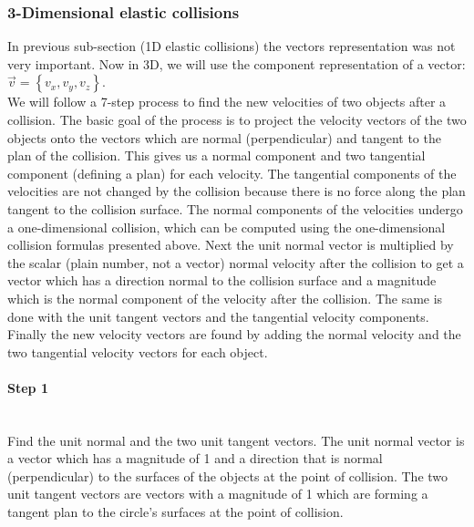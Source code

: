 \subsubsection{3-Dimensional elastic collisions}
In previous sub-section (1D elastic collisions) the vectors representation was not very important.
Now in 3D, we will use the component representation of a vector: $\vec{v} = \left\{ v_x, v_y, v_z \right\}$.\\

We will follow a 7-step process to find the new velocities of two objects after a collision. 
The basic goal of the process is to project the velocity vectors of the two objects onto the vectors which are normal (perpendicular) and tangent to the plan of the collision. 
This gives us a normal component and two tangential component (defining a plan) for each velocity. 
The tangential components of the velocities are not changed by the collision because there is no force along the plan tangent to the collision surface. 
The normal components of the velocities undergo a one-dimensional collision, which can be computed using the one-dimensional collision formulas presented above.
Next the unit normal vector is multiplied by the scalar (plain number, not a vector) normal velocity after the collision to get a vector which has a direction normal to the collision surface and a magnitude which is the normal component of the velocity after the collision. 
The same is done with the unit tangent vectors and the tangential velocity components. 
Finally the new velocity vectors are found by adding the normal velocity and the two tangential velocity vectors for each object.

\paragraph{Step 1}
~\\
Find the unit normal and the two unit tangent vectors.
The unit normal vector is a vector which has a magnitude of 1 and a direction that is normal (perpendicular) to the surfaces of the objects at the point of collision. 
The two unit tangent vectors are vectors with a magnitude of 1 which are forming a tangent plan to the circle's surfaces at the point of collision.
	
